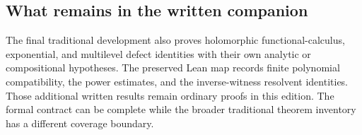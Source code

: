 \subsection{What remains in the written companion}

The final traditional development also proves holomorphic functional-calculus, exponential, and multilevel defect identities with their own analytic or compositional hypotheses. The preserved Lean map records finite polynomial compatibility, the power estimates, and the inverse-witness resolvent identities. Those additional written results remain ordinary proofs in this edition. The formal contract can be complete while the broader traditional theorem inventory has a different coverage boundary.
